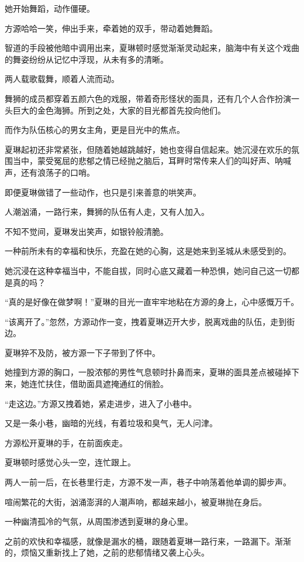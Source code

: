 \begin{this_body}
她开始舞蹈，动作僵硬。

方源哈哈一笑，伸出手来，牵着她的双手，带动着她舞蹈。

智道的手段被他暗中调用出来，夏琳顿时感觉渐渐灵动起来，脑海中有关这个戏曲的舞姿纷纷从记忆中浮现，从未有多的清晰。

两人载歌载舞，顺着人流而动。

舞狮的成员都穿着五颜六色的戏服，带着奇形怪状的面具，还有几个人合作扮演一头巨大的金色海狮。所到之处，大家的目光都首先投向他们。

而作为队伍核心的男女主角，更是目光中的焦点。

夏琳起初还非常紧张，但随着她越跳越好，她也变得自信起来。她沉浸在欢乐的氛围当中，蒙受冤屈的悲郁之情已经抛之脑后，耳畔时常传来人们的叫好声、呐喊声，还有浪荡子的口哨。

即便夏琳做错了一些动作，也只是引来善意的哄笑声。

人潮汹涌，一路行来，舞狮的队伍有人走，又有人加入。

不知不觉间，夏琳发出笑声，如银铃般清脆。

一种前所未有的幸福和快乐，充盈在她的心胸，这是她来到圣城从未感受到的。

她沉浸在这种幸福当中，不能自拔，同时心底又藏着一种恐惧，她问自己这一切都是真的吗？

“真的是好像在做梦啊！”夏琳的目光一直牢牢地粘在方源的身上，心中感慨万千。

“该离开了。”忽然，方源动作一变，拽着夏琳迈开大步，脱离戏曲的队伍，走到街边。

夏琳猝不及防，被方源一下子带到了怀中。

她撞到方源的胸口，一股浓郁的男性气息顿时扑鼻而来，夏琳的面具差点被碰掉下来，她连忙扶住，借助面具遮掩通红的俏脸。

“走这边。”方源又拽着她，紧走进步，进入了小巷中。

又是一条小巷，幽暗的光线，有着垃圾和臭气，无人问津。

方源松开夏琳的手，在前面疾走。

夏琳顿时感觉心头一空，连忙跟上。

两人一前一后，在长巷里行走，方源不发一声，巷子中响荡着他单调的脚步声。

喧闹繁花的大街，汹涌澎湃的人潮声响，都越来越小，被夏琳抛在身后。

一种幽清孤冷的气氛，从周围渗透到夏琳的身心里。

之前的欢快和幸福感，就像是漏水的桶，跟随着夏琳一路行来，一路漏下。渐渐的，烦恼又重新找上了她，之前的悲郁情绪又袭上心头。


\end{this_body}

